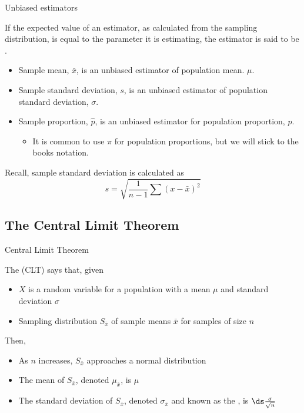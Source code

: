 \documentclass[xcolor=table, handout]{beamer}
\begin{document}
\begin{frame}{Unbiased estimators}
\begin{block}{}
\large If the expected value of an estimator, as calculated from the sampling distribution, is equal to the parameter it is estimating, the estimator is said to be . 
\begin{itemize}
\pause\item Sample mean, $\bar x$, is an unbiased estimator of population mean. $\mu$.
\pause\item Sample standard deviation, $s$, is an unbiased estimator of population standard deviation, $\sigma$.
\pause\item Sample proportion, $\hat p$, is an unbiased estimator for population proportion, $p$.
\begin{itemize}
\item It is common to use $\pi$ for population proportions, but we will stick to the books notation. 
\end{itemize}
\end{itemize}
\end{block}

\pause
\begin{alertblock}{}
Recall, sample standard deviation is calculated as 
\[s = \sqrt{\frac 1 {n-1} \sum (x - \bar x)^2}\]
\end{alertblock}
\end{frame}

\subsection{The Central Limit Theorem}

\begin{frame}{Central Limit Theorem}
\begin{block}{}
\large
The  (CLT) says that, given
\begin{itemize}
\pause\item $X$ is a random variable for a population with a mean $\mu$ and standard deviation $\sigma$
\pause\item Sampling distribution $S_{\bar x}$ of sample means $\bar x$ for samples of size $n$
\end{itemize}
\pause Then,
\begin{itemize}
\item As $n$ increases, $S_{\bar x}$ approaches a normal distribution
\pause\item The mean of $S_{\bar x}$, denoted $\mu_{\bar x}$, is $\mu$
\pause\item The standard deviation of $S_{\bar x}$, denoted $\sigma_{\bar x}$ and known as the , is $\ds \frac \sigma {\sqrt n}$  
\end{itemize}
\end{block}
\end{frame}
\end{document}
